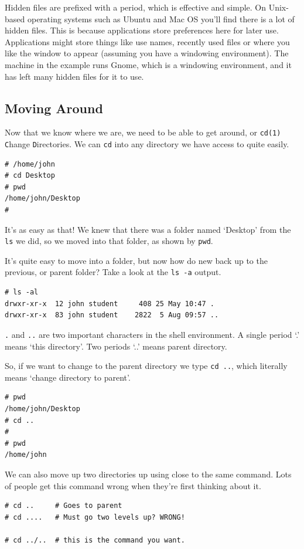 Hidden files are prefixed with a period, which is effective and simple.  
On Unix-based operating systems such as Ubuntu and Mac OS you'll find 
there is a lot of hidden files.  This is because applications store 
preferences here for later use.  Applications
might store things like use names, recently used files or where you like 
the window to appear (assuming you have a windowing environment).
The machine in the example runs Gnome, which is a windowing environment, and it has left many hidden files for it to use.

\subsection{Moving Around}
Now that we know where we are, we need to be able to get around, or {\tt cd(1)} {\tt C}hange {\tt D}irectories.
We can {\tt cd} into any directory we have access to quite easily.
{\tt \begin{verbatim}
# /home/john
# cd Desktop
# pwd
/home/john/Desktop
#
\end{verbatim}
}
It's as easy as that! We knew that there was a folder named `Desktop' from the {\tt ls} 
we did, so we moved into that folder, as shown by {\tt pwd}.

It's quite easy to move into a folder, but now how do new back up to the 
previous, or parent folder? Take a look at the {\tt ls -a} output. 
{\tt \begin{verbatim}
# ls -al
drwxr-xr-x  12 john student     408 25 May 10:47 .
drwxr-xr-x  83 john student    2822  5 Aug 09:57 ..
\end{verbatim}
}

{\tt .} and {\tt ..} are two important characters in the shell environment.  A single period `.' means `this directory'. Two periods `..' means parent directory.

So, if we want to change to the parent directory we type {\tt cd ..}, which literally means `change directory to parent'.
{\tt \begin{verbatim}
# pwd
/home/john/Desktop
# cd ..
#
# pwd
/home/john
\end{verbatim}
}

We can also move up two directories up using close to the same command. Lots
 of people get this command wrong when they're first thinking about it.
{\tt \begin{verbatim}
# cd ..     # Goes to parent
# cd ....   # Must go two levels up? WRONG!

# cd ../..  # this is the command you want.
\end{verbatim}
}

